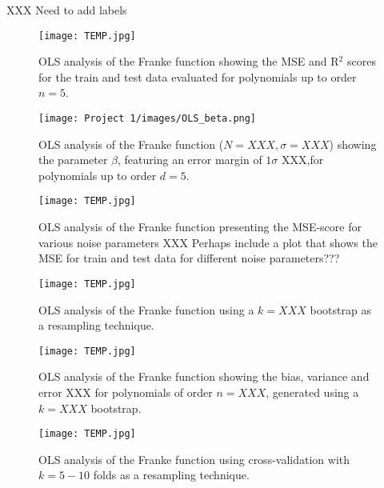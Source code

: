 \documentclass[reprint,english,notitlepage]{revtex4-1}  %
\begin{document}
XXX Need to add labels 

\begin{figure}[h!]
    \centering %
    \texttt{[image: TEMP.jpg]} %
    \caption{OLS analysis of the Franke function showing the MSE and R$^2$ scores for the train and test data evaluated for polynomials up to order $n=5$.}
    \label{fig: OLS_scores}
\end{figure}

\begin{figure}[h!]
    \centering %
    \texttt{[image: Project 1/images/OLS\_beta.png]} %
    \caption{OLS analysis of the Franke function ($N=XXX, \sigma=XXX$) showing the parameter $\beta$, featuring an error margin of $1\sigma$ XXX,for polynomials up to order $d = 5$.}
    \label{fig: OLS_beta}
\end{figure}

\begin{figure}[h!]
    \centering %
    \texttt{[image: TEMP.jpg]} %
    \caption{OLS analysis of the Franke function presenting the MSE-score for various noise parameters XXX 
    Perhaps include a plot that shows the MSE for train and test data for different noise parameters??? }
    \label{fig: OLS_noise}
\end{figure}


\begin{figure}[h!]
    \centering %
    \texttt{[image: TEMP.jpg]} %
    \caption{OLS analysis of the Franke function using a $k = XXX$ bootstrap as a resampling technique.}
    \label{fig: OLS_bootstrap}
\end{figure}

\begin{figure}[h!]
    \centering %
    \texttt{[image: TEMP.jpg]} %
    \caption{OLS analysis of the Franke function showing the bias, variance and error XXX for polynomials of order $n=XXX$, generated using a $k=XXX$ bootstrap. }
    \label{fig: OLS_bias-variance}
\end{figure}


\begin{figure}[h!]
    \centering %
    \texttt{[image: TEMP.jpg]} %
    \caption{OLS analysis of the Franke function using cross-validation with $k = 5-10$ folds as a resampling technique.}
    \label{fig: OLS_crossvalidation}
\end{figure}
\end{document}
